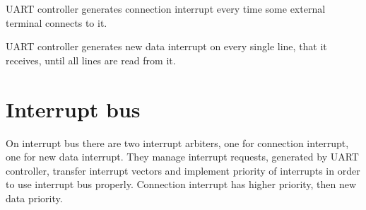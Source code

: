 UART controller generates connection interrupt every time some external terminal connects to it.

UART controller generates new data interrupt on every single line, that it receives, until all lines are read from it.

\section*{Interrupt bus}

On interrupt bus there are two interrupt arbiters, one for connection interrupt, one for new data interrupt. They manage interrupt requests, generated by UART controller, transfer interrupt vectors and implement priority of interrupts in order to use interrupt bus properly. Connection interrupt has higher priority, then new data priority.
